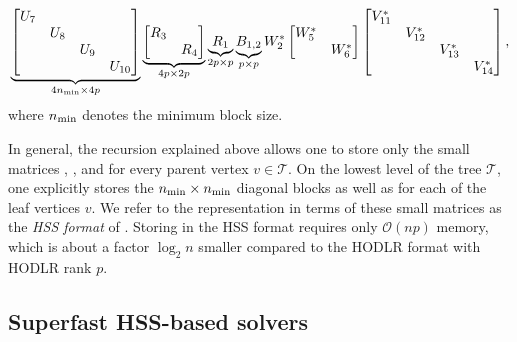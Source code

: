 \[
 \underbrace{\begin{bmatrix} 
U_{7} & & & \\
& U_{8} & & \\
& & U_{9} & \\
& & & U_{10}
\end{bmatrix}}_{4 n_{\min} \times 4 p} \underbrace{\begin{bmatrix} R_3 & \\ & R_4\end{bmatrix}}_{4p \times 2p} \underbrace{R_1}_{2p\times p} \underbrace{B_{1,2}}_{p \times p} W_2^* \begin{bmatrix} W_5^* & \\ & W_6^*\end{bmatrix} \begin{bmatrix} 
V_{11}^* & & & \\
& V_{12}^* & & \\
& & V_{13}^* & \\
& & & V_{14}^*
\end{bmatrix},
\]
where $n_{\min}$ denotes the minimum block size.

In general, the recursion explained above allows one to store only the small matrices , , and  for every parent vertex $v\in \mathcal T$. On the lowest level \smash{$\widehat{\ell}$} of the tree $\mathcal T$,
one explicitly stores the $n_{\min} \times n_{\min}$ diagonal blocks as well as   for each of the  leaf vertices $v$. We refer to the representation in terms of these small matrices as the \textit{HSS format} of . Storing  in the HSS format requires only $\mathcal{O}(n p)$ memory, which is about a factor $\log_2 n$ smaller compared to the HODLR format with HODLR rank $p$.

\subsection{Superfast HSS-based solvers}

\label{sec:advantagesHSS} 

